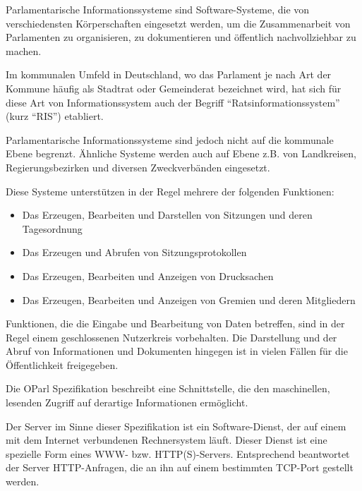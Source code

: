 \documentclass[,a4paper]{article}
\begin{document}
Parlamentarische Informationssysteme sind Software-Systeme, die von
verschiedensten Körperschaften eingesetzt werden, um die Zusammenarbeit
von Parlamenten zu organisieren, zu dokumentieren und öffentlich
nachvollziehbar zu machen.

Im kommunalen Umfeld in Deutschland, wo das Parlament je nach Art der
Kommune häufig als Stadtrat oder Gemeinderat bezeichnet wird, hat sich
für diese Art von Informationssystem auch der Begriff
``Ratsinformationssystem'' (kurz ``RIS'') etabliert.

Parlamentarische Informationssysteme sind jedoch nicht auf die kommunale
Ebene begrenzt. Ähnliche Systeme werden auch auf Ebene z.B. von
Landkreisen, Regierungsbezirken und diversen Zweckverbänden eingesetzt.

Diese Systeme unterstützen in der Regel mehrere der folgenden
Funktionen:

\begin{itemize}
\item
  Das Erzeugen, Bearbeiten und Darstellen von Sitzungen und deren
  Tagesordnung
\item
  Das Erzeugen und Abrufen von Sitzungsprotokollen
\item
  Das Erzeugen, Bearbeiten und Anzeigen von Drucksachen
\item
  Das Erzeugen, Bearbeiten und Anzeigen von Gremien und deren
  Mitgliedern
\end{itemize}

Funktionen, die die Eingabe und Bearbeitung von Daten betreffen, sind in
der Regel einem geschlossenen Nutzerkreis vorbehalten. Die Darstellung
und der Abruf von Informationen und Dokumenten hingegen ist in vielen
Fällen für die Öffentlichkeit freigegeben.

Die OParl Spezifikation beschreibt eine Schnittstelle, die den
maschinellen, lesenden Zugriff auf derartige Informationen ermöglicht.


Der Server im Sinne dieser Spezifikation ist ein Software-Dienst, der
auf einem mit dem Internet verbundenen Rechnersystem läuft. Dieser
Dienst ist eine spezielle Form eines WWW- bzw. HTTP(S)-Servers.
Entsprechend beantwortet der Server HTTP-Anfragen, die an ihn auf einem
bestimmten TCP-Port gestellt werden.
\end{document}
